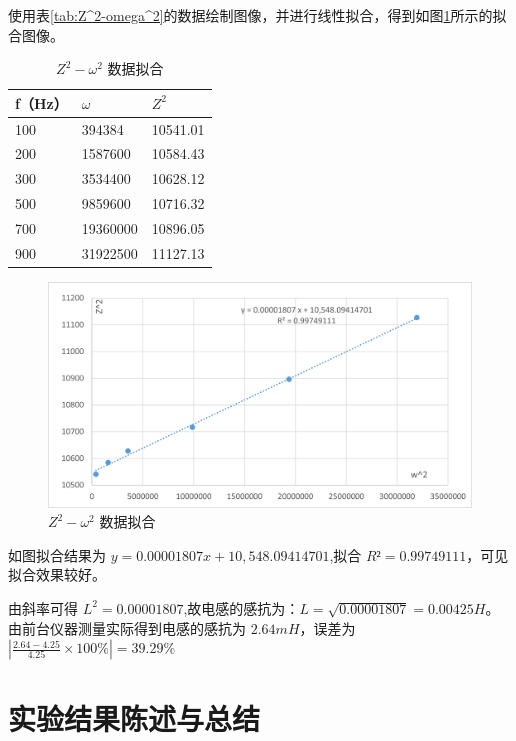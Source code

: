 \documentclass[a4paper]{../phyreport}
\begin{document}
使用表\ref{tab:Z^2-omega^2}的数据绘制图像，并进行线性拟合，得到如图\ref{fig:Z^2-omega^2}所示的拟合图像。
\begin{table}[H]
  \begin{minipage}{0.5\linewidth}
  \centering
  \caption{$Z^2-\omega^2$ 数据}
  \label{tab:Z^2-omega^2}
  \begin{tabular}{lll}
    \hline
    f（Hz） & $\omega$       & $Z^2$        \\ \hline
    100   & 394384   & 10541.01 \\
    200   & 1587600  & 10584.43 \\
    300   & 3534400  & 10628.12 \\
    500   & 9859600  & 10716.32 \\
    700   & 19360000 & 10896.05 \\
    900   & 31922500 & 11127.13 \\ \hline
    \end{tabular}
  \end{minipage}
  \begin{minipage}{0.48\linewidth}
    \begin{figure}[H]
      \centering
      \includegraphics[width=0.95\columnwidth]{./fig/Z^2-omega^2.png}
      \caption{$Z^2-\omega^2$ 数据拟合}
      \label{fig:Z^2-omega^2}
    \end{figure}
  \end{minipage}
\end{table}

如图拟合结果为 $y = 0.00001807 x + 10,548.09414701$,拟合 $R² = 0.99749111$，可见拟合效果较好。

由斜率可得 $L^2 = 0.00001807$,故电感的感抗为：$L=\sqrt{0.00001807}=0.00425H$。由前台仪器测量实际得到电感的感抗为 $2.64mH$，误差为$|\frac{2.64-4.25}{4.25}\times 100\%| = 39.29\%$

\longLine  
\section{实验结果陈述与总结}
\end{document}
